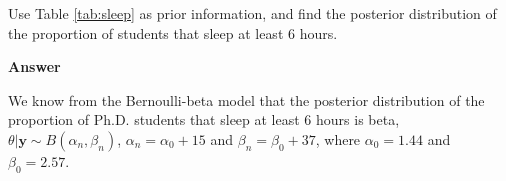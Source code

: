 \begin{enumerate}[leftmargin=*]
\begin{table}[!htbp]
\begin{tabular}{cccccccccccc}
	\end{tabular}
\end{table}
Use Table \ref{tab:sleep} as prior information, and find the posterior distribution of the proportion of students that sleep at least 6 hours.

\textbf{Answer}

We know from the Bernoulli-beta model that the posterior distribution of the proportion of Ph.D. students that sleep at least 6 hours is beta, $\theta|\bm{y}\sim B(\alpha_n,\beta_n)$, $\alpha_n=\alpha_0+15$ and $\beta_n=\beta_0+37$, where $\alpha_0=1.44$ and $\beta_0=2.57$. 


\end{enumerate}
